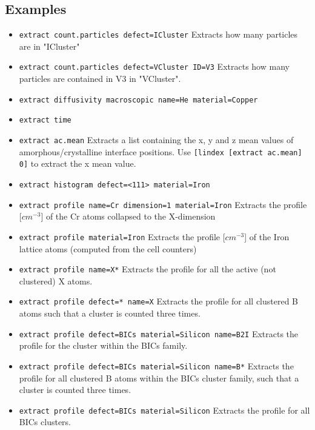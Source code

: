 \subsection{Examples}
\begin{itemize}
\item \verb+extract count.particles defect=ICluster+ Extracts how many particles are in "ICluster"
\item \verb+extract count.particles defect=VCluster ID=V3+ Extracts how many particles are contained in V3 in "VCluster".
\item \verb+extract diffusivity macroscopic name=He material=Copper+
\item \verb+extract time+
\item \verb+extract ac.mean+ Extracts a list containing the x, y and z mean values of amorphous/crystalline interface positions. Use \verb+[lindex [extract ac.mean] 0]+ to extract the x mean value.
\item \verb+extract histogram defect=<111> material=Iron+ 
\item \verb+extract profile name=Cr dimension=1 material=Iron+ Extracts the profile [$cm^{-3}$] of the Cr atoms collapsed to the X-dimension
\item \verb+extract profile material=Iron+ Extracts the profile [$cm^{-3}$] of the Iron lattice atoms (computed from the cell counters)
\item \verb+extract profile name=X*+ Extracts the profile for all the active (not clustered) X atoms.
\item \verb+extract profile defect=* name=X+ Extracts the profile for all clustered B atoms such that a  cluster is counted three times.
\item \verb+extract profile defect=BICs material=Silicon name=B2I+ Extracts the profile for the  cluster within the BICs family.
\item \verb+extract profile defect=BICs material=Silicon name=B*+ Extracts the profile for all clustered B atoms within the BICs cluster family, such that a  cluster is counted three times.
\item \verb+extract profile defect=BICs material=Silicon+ Extracts the profile for all BICs clusters.
\end{itemize}
